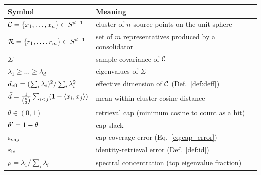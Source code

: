 \begin{center}
\begin{tabular}{ll}
\toprule
Symbol & Meaning \\
\midrule
$\mathcal{C} = \{x_1, \ldots, x_n\} \subset S^{d-1}$ & cluster of $n$
source points on the unit sphere \\
$\mathcal{R} = \{r_1, \ldots, r_m\} \subset S^{d-1}$ & set of $m$
representatives produced by a consolidator \\
$\Sigma$ & sample covariance of $\mathcal{C}$ \\
$\lambda_1 \geq \ldots \geq \lambda_d$ & eigenvalues of $\Sigma$ \\
${d_{\mathrm{eff}}} = (\sum_i \lambda_i)^2 / \sum_i \lambda_i^2$ & effective dimension
of $\mathcal{C}$ (Def.~\ref{def:deff}) \\
$\bar{d} = \tfrac{1}{\binom{n}{2}} \sum_{i<j} (1 - \left\langle x_i,x_j\right\rangle)$ &
mean within-cluster cosine distance \\
$\theta \in (0, 1)$ & retrieval cap (minimum cosine to count as a hit) \\
$\theta' = 1 - \theta$ & cap slack \\
$\varepsilon_{\mathrm{cap}}$ & cap-coverage error (Eq.~\ref{eq:cap_error}) \\
$\varepsilon_{\mathrm{id}}$ & identity-retrieval error (Def.~\ref{def:id}) \\
$\rho = \lambda_1 / \sum_i \lambda_i$ & spectral concentration (top eigenvalue fraction) \\
\bottomrule
\end{tabular}
\end{center}
